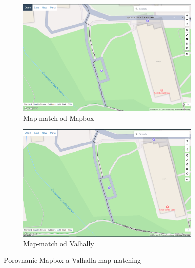 \begin{figure}[H]
\centering
\begin{subfigure}{.45\textwidth}
  \centering
  \includegraphics[width=1\textwidth]{img/porovnanie_map_match/mapbox-map-match.png}
  \caption{Map-match od Mapbox}
  \label{fig:mapbox-map-match}
\end{subfigure}
\begin{subfigure}{.45\textwidth}
  \centering
  \includegraphics[width=1\textwidth]{img/porovnanie_map_match/valhalla-map-match.png}
  \caption{Map-match od Valhally}
  \label{fig:valhalla-map-match}
\end{subfigure}
\caption{Porovnanie Mapbox a Valhalla map-matching}
\label{fig:mapbox-map-match-vs-valhalla}
\end{figure}